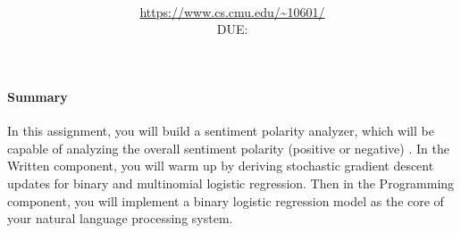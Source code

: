 \documentclass[11pt,addpoints,answers]{exam}
\title{\textsc{\hwName}
} %
\author{\courseName\\
\url{https://www.cs.cmu.edu/~10601/} \\
DUE: \dueDate{} \\ 
}
\date{}
\date{}
\begin{document}
\maketitle

\begin{notebox}
\paragraph{Summary} In this assignment, you will build a sentiment polarity analyzer, which will be capable of analyzing the overall sentiment polarity (positive or negative) . In the Written component, you will warm up by deriving stochastic gradient descent updates for binary and multinomial logistic regression. Then in the Programming component, you will implement a binary logistic regression model as the core of your natural language processing system.
\end{notebox}
\end{document}
